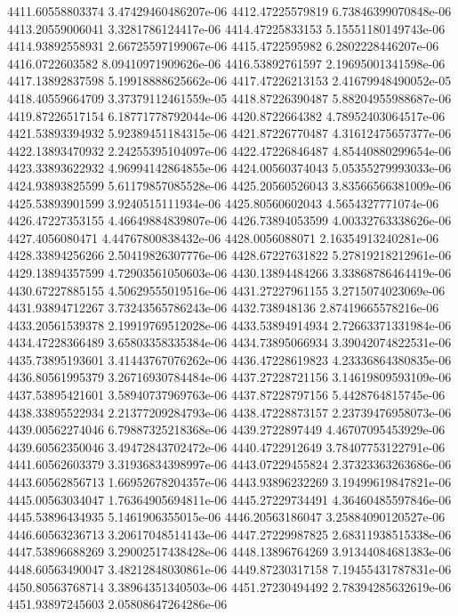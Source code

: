 {4411.60558803374 3.47429460486207e-06
4412.47225579819 6.73846399070848e-06
4413.20559006041 3.3281786124417e-06
4414.47225833153 5.15551180149743e-06
4414.93892558931 2.66725597199067e-06
4415.4722595982 6.2802228446207e-06
4416.0722603582 8.09410971909626e-06
4416.53892761597 2.19695001341598e-06
4417.13892837598 5.19918888625662e-06
4417.47226213153 2.41679948490052e-05
4418.40559664709 3.37379112461559e-05
4418.87226390487 5.88204955988687e-06
4419.87226517154 6.18771778792044e-06
4420.8722664382 4.78952403064517e-06
4421.53893394932 5.92389451184315e-06
4421.87226770487 4.31612475657377e-06
4422.13893470932 2.24255395104097e-06
4422.47226846487 4.85440880299654e-06
4423.33893622932 4.96994142864855e-06
4424.00560374043 5.05355279993033e-06
4424.93893825599 5.61179857085528e-06
4425.20560526043 3.83566566381009e-06
4425.53893901599 3.9240515111934e-06
4425.80560602043 4.5654327771074e-06
4426.47227353155 4.46649884839807e-06
4426.73894053599 4.00332763338626e-06
4427.4056080471 4.44767800838432e-06
4428.0056088071 2.16354913240281e-06
4428.33894256266 2.50419826307776e-06
4428.67227631822 5.27819218212961e-06
4429.13894357599 4.72903561050603e-06
4430.13894484266 3.33868786464419e-06
4430.67227885155 4.50629555019516e-06
4431.27227961155 3.2715074023069e-06
4431.93894712267 3.73243565786243e-06
4432.738948136 2.87419665578216e-06
4433.20561539378 2.19919769512028e-06
4433.53894914934 2.72663371331984e-06
4434.47228366489 3.65803358335384e-06
4434.73895066934 3.39042074822531e-06
4435.73895193601 3.41443767076262e-06
4436.47228619823 4.23336864380835e-06
4436.80561995379 3.26716930784484e-06
4437.27228721156 3.14619809593109e-06
4437.53895421601 3.58940737969763e-06
4437.87228797156 5.4428764815745e-06
4438.33895522934 2.21377209284793e-06
4438.47228873157 2.23739476958073e-06
4439.00562274046 6.79887325218368e-06
4439.2722897449 4.46707095453929e-06
4439.60562350046 3.49472843702472e-06
4440.4722912649 3.78407753122791e-06
4441.60562603379 3.31936834398997e-06
4443.07229455824 2.37323363263686e-06
4443.60562856713 1.66952678204357e-06
4443.93896232269 3.19499619847821e-06
4445.00563034047 1.76364905694811e-06
4445.27229734491 4.36460485597846e-06
4445.53896434935 5.1461906355015e-06
4446.20563186047 3.25884090120527e-06
4446.60563236713 3.20617048514143e-06
4447.27229987825 2.68311938515338e-06
4447.53896688269 3.29002517438428e-06
4448.13896764269 3.91344084681383e-06
4448.60563490047 3.48212848030861e-06
4449.87230317158 7.19455431787831e-06
4450.80563768714 3.38964351340503e-06
4451.27230494492 2.78394285632619e-06
4451.93897245603 2.05808647264286e-06
}
